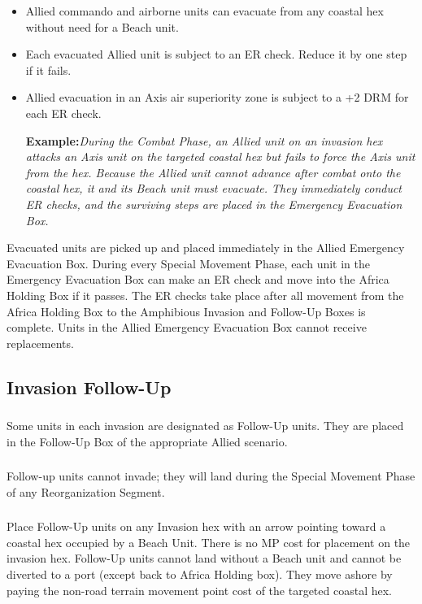 \begin{itemize}
    \item Allied commando and airborne units can evacuate from any coastal hex without need for a Beach unit.
    \item Each evacuated Allied unit is subject to an ER check. Reduce it by one step if it fails.
    \item Allied evacuation in an Axis air superiority zone is subject to a +2 DRM for each ER check.
    
    \textbf{Example:}\textit{During the Combat Phase, an Allied unit on an invasion hex attacks an Axis unit on the targeted coastal hex but fails to force the Axis unit from the hex. Because the Allied unit cannot advance after combat onto the coastal hex, it and its Beach unit must evacuate. They immediately conduct ER checks, and the surviving steps are placed in the Emergency Evacuation Box.}
\end{itemize}

Evacuated units are picked up and placed immediately in the Allied Emergency Evacuation Box. During every Special Movement Phase, each unit in the Emergency Evacuation Box can make an ER check and move into the Africa Holding Box if it passes. The ER checks take place after all movement from the Africa Holding Box to the Amphibious Invasion and Follow-Up Boxes is complete. Units in the Allied Emergency Evacuation Box cannot receive replacements.

\subsection{Invasion Follow-Up}

\subsubsection{} Some units in each invasion are designated as Follow-Up units. They are placed in the Follow-Up Box of the appropriate Allied scenario.

\subsubsection{} Follow-up units cannot invade; they will land during the Special Movement Phase of any Reorganization Segment.

\subsubsection{} Place Follow-Up units on any Invasion hex with an arrow pointing toward a coastal hex occupied by a Beach Unit. There is no MP cost for placement on the invasion hex. Follow-Up units cannot land without a Beach unit and cannot be diverted to a port (except back to Africa Holding box). They move ashore by paying the non-road terrain movement point cost of the targeted coastal hex.

